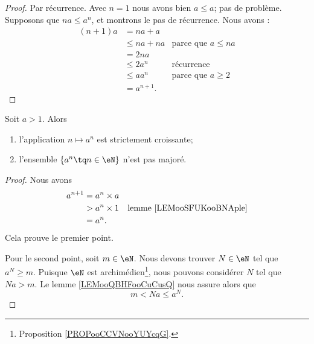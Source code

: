 \begin{proof}
    Par récurrence. Avec \( n=1\) nous avons bien \( a\leq a\); pas de problème. Supposons que \( na\leq a^n\), et montrons le pas de récurrence. Nous avons :
    \begin{subequations}
        \begin{align}
            (n+1)a&=na+a\\
            &\leq na+na     &\text{parce que }  a\leq na\\
            &=2na\\
            &\leq 2a^n      &\text{récurrence}\\
            &\leq aa^n       &\text{parce que } a\geq 2\\
            &=a^{n+1}.
        \end{align}
    \end{subequations}
\end{proof}

\begin{proposition}
    Soit \( a>1\). Alors
    \begin{enumerate}
        \item
            l'application \( n\mapsto a^n\) est strictement croissante;
        \item
            l'ensemble \( \{ a^n\tq n\in \eN \}\) n'est pas majoré.
    \end{enumerate}
\end{proposition}

\begin{proof}
    Nous avons
    \begin{subequations}
        \begin{align}
        a^{n+1}&=a^n\times a\\
        &>a^n\times 1       &\text{lemme \ref{LEMooSFUKooBNAple}}\\
        &=a^n.
        \end{align}
    \end{subequations}
    Cela prouve le premier point.

    Pour le second point, soit \( m\in \eN\). Nous devons trouver \( N\in \eN\) tel que \( a^N\geq m\). Puisque \( \eN\) est archimédien\footnote{Proposition \ref{PROPooCCVNooYUYcqG}.}, nous pouvons considérer \( N\) tel que \( Na>m\). Le lemme \ref{LEMooQBHFooCuCusQ} nous assure alors que
    \begin{equation}
        m<Na\leq a^N.
    \end{equation}
\end{proof}

